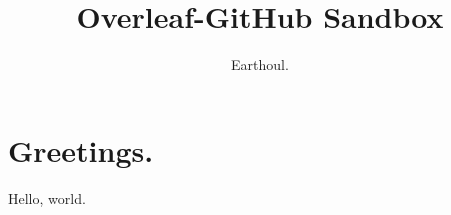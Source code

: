 \documentclass{article}
\title{Overleaf-GitHub Sandbox}
\author{Earthoul.}
\begin{document}
\maketitle

\section{Greetings.}
Hello, world.
\end{document}
